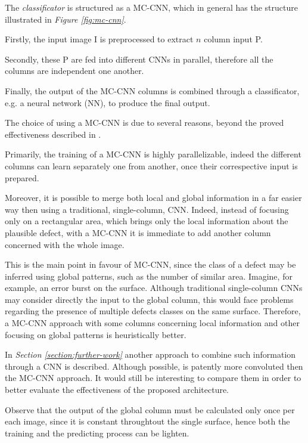     \par{
        The \emph{classificator} is structured as a MC-CNN, which in general has the structure illustrated in \emph{Figure \ref{fig:mc-cnn}}. 
    }
    \par{
        Firstly, the input image I is preprocessed to extract $n$ column input P.
    }
    \par{
        Secondly, these P are fed into different CNNs in parallel, therefore all the columns are independent one another. 
    }
    \par{
        Finally, the output of the MC-CNN columns is combined through a classificator, e.g. a neural network (NN), to produce the final output.
    }
    \par{
        The choice of using a MC-CNN is due to several reasons, beyond the proved effectiveness described in \cite{ieee:6248110}.
    }
    \par{
        Primarily, the training of a MC-CNN is highly parallelizable, indeed the different columns can learn separately one from another, once their correspective input is prepared.
    }
    \par{
        Moreover, it is possible to merge both local and global information in a far easier way then using a traditional, single-column, CNN. Indeed, instead of focusing only on a rectangular area, which brings only the local information about the plausible defect, with a MC-CNN it is immediate to add another column concerned with the whole image.
    }
    \par{
        This is the main point in favour of MC-CNN, since the class of a defect may be inferred using global patterns, such as the number of similar area. Imagine, for example, an error burst on the surface. Although traditional single-column CNNs may consider directly the input to the global column, this would face problems regarding the presence of multiple defects classes on the same surface. Therefore, a MC-CNN approach with some columns concerning local information and other focusing on global patterns is heuristically better.
    }
    \par{
        In \emph{Section \ref{section:further-work}} another approach to combine such information through a CNN is described. Although possible, is patently more convoluted then the MC-CNN approach. It would still be interesting to compare them in order to better evaluate the effectiveness of the proposed architecture. 
    }
    \par{
        Observe that the output of the global column must be calculated only once per each image, since it is constant throughtout the single surface, hence both the training and the predicting process can be lighten.
    }
